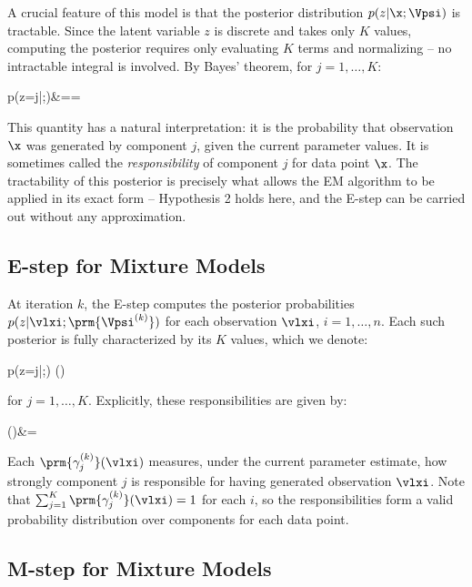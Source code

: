 A crucial feature of this model is that the posterior distribution $p(z|\x;\Vpsi)$ is tractable. Since the latent variable $z$ is discrete and takes only $K$ values, computing the posterior requires only evaluating $K$ terms and normalizing -- no intractable integral is involved. By Bayes' theorem, for $j = 1,\ldots,K$:
\begin{myalign}
	p(z=j|\x ;\Vpsi)&==
\end{myalign}
This quantity has a natural interpretation: it is the probability that observation $\x$ was generated by component $j$, given the current parameter values. It is sometimes called the \emph{responsibility} of component $j$ for data point $\x$. The tractability of this posterior is precisely what allows the EM algorithm to be applied in its exact form -- Hypothesis 2 holds here, and the E-step can be carried out without any approximation.

\subsection*{E-step for Mixture Models}

At iteration $k$, the E-step computes the posterior probabilities $p(z|\vlxi;\prm{\Vpsi^{(k)}})$ for each observation $\vlxi$, $i=1,\ldots,n$. Each such posterior is fully characterized by its $K$ values, which we denote:
\begin{myequation}
 p(z=j|\vlxi ;)  {}(\vlxi)
\end{myequation}
for $j=1,\ldots,K$. Explicitly, these responsibilities are given by:
\begin{myalign}
	(\vlxi)&=
\end{myalign}
Each $\prm{\gamma_j^{(k)}}(\vlxi)$ measures, under the current parameter estimate, how strongly component $j$ is responsible for having generated observation $\vlxi$. Note that $\sum_{j=1}^K \prm{\gamma_j^{(k)}}(\vlxi) = 1$ for each $i$, so the responsibilities form a valid probability distribution over components for each data point.

\subsection*{M-step for Mixture Models}

